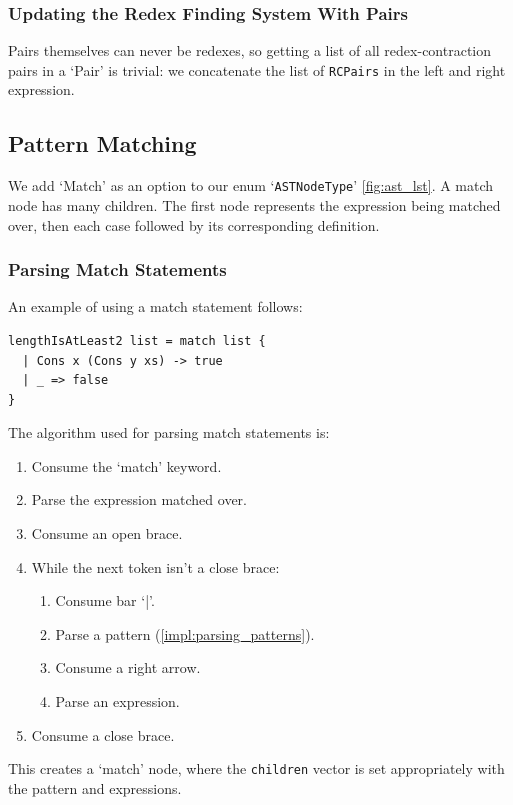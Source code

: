 \subsubsection{Updating the Redex Finding System With Pairs}
Pairs themselves can never be redexes, so getting a list of all redex-contraction pairs in a `Pair' is trivial: we concatenate the list of \verb|RCPairs| in the left and right expression.

\subsection{Pattern Matching}
We add `Match' as an option to our enum `\verb|ASTNodeType|' \ref{fig:ast_lst}. A match node has many children. The first node represents the expression being matched over, then each case followed by its corresponding definition.
 
\subsubsection{Parsing Match Statements}
An example of using a match statement follows:
\begin{lstlisting}[language=SFL]
lengthIsAtLeast2 list = match list {
  | Cons x (Cons y xs) -> true
  | _ => false
}
\end{lstlisting}

The algorithm used for parsing match statements is:
\begin{enumerate}
    \item Consume the `match' keyword.
    \item Parse the expression matched over.
    \item Consume an open brace.
    \item While the next token isn't a close brace: \begin{enumerate}
        \item Consume bar `|'.
        \item Parse a pattern (\ref{impl:parsing_patterns}).
        \item Consume a right arrow.
        \item Parse an expression.
    \end{enumerate}
    \item Consume a close brace.
\end{enumerate}
This creates a `match' node, where the \verb|children| vector is set appropriately with the pattern and expressions.

